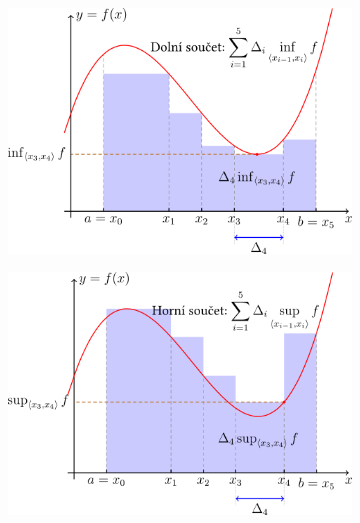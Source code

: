 \documentclass{szzclass}
\begin{document}
\begin{figure}[h]
    \begin{subfigure}{.5\textwidth}
        \includegraphics[width=\textwidth, center]{topics/bi-spol-35/images/fig_dolni_soucet.png}
    \end{subfigure}
    \begin{subfigure}{.5\textwidth}
        \includegraphics[width=\textwidth, center]{topics/bi-spol-35/images/fig_horni_soucet.png}
    \end{subfigure}
\end{figure}
\end{document}
